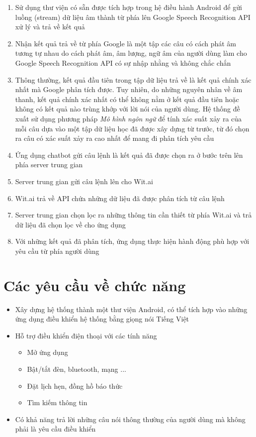 \documentclass[12pt]{report}
\begin{document}
\begin{enumerate}
	\item Sử dụng thư viện có sẵn được tích hợp trong hệ điều hành Android để gửi luồng (stream) dữ liệu âm thành từ phía lên Google Speech Recognition API xử lý và trả về kết quả
	\item Nhận kết quả trả về từ phía Google là một tập các câu có cách phát âm tương tự nhau do cách phát âm, âm lượng, ngữ âm của người dùng làm cho Google Speech Recognition API có sự nhập nhằng và không chắc chắn
	\item Thông thường, kết quả đầu tiên trong tập dữ liệu trả về là kết quả chính xác nhất mà Google phân tích được. Tuy nhiên, do những nguyên nhân về âm thanh, kết quả chính xác nhất có thể không nằm ở kết quả đầu tiên hoặc không có kết quả nào trùng khớp với lời nói của người dùng. Hệ thống đề xuất sử dụng phương pháp \textit{Mô hình ngôn ngữ} để tính xác suất xảy ra của mỗi câu dựa vào một tập dữ liệu học đã được xây dựng từ trước, từ đó chọn ra câu có xác suất xảy ra cao nhất để mang đi phân tích yêu cầu
	\item Ứng dụng chatbot gửi câu lệnh là kết quả đã được chọn ra ở bước trên lên phía server trung gian
	\item Server trung gian gửi câu lệnh lên cho Wit.ai
	\item Wit.ai trả về API chứa những dữ liệu đã được phân tích từ câu lệnh
	\item Server trung gian chọn lọc ra những thông tin cần thiết từ phía Wit.ai và trả dữ liệu đã chọn lọc về cho ứng dụng
	\item Với những kết quả đã phân tích, ứng dụng thực hiện hành động phù hợp với yêu cầu từ phía người dùng
\end{enumerate}

\section{Các yêu cầu về chức năng}
\begin{itemize}
	\item Xây dựng hệ thống thành một thư viện Android, có thể tích hợp vào những ứng dụng điều khiển hệ thống bằng giọng nói Tiếng Việt
	\item Hỗ trợ điều khiển điện thoại với các tính năng
	\begin{itemize}
		\item Mở ứng dụng
		\item Bật/tắt đèn, bluetooth, mạng ...
		\item Đặt lịch hẹn, đồng hồ báo thức
		\item Tìm kiếm thông tin
	\end{itemize}
	\item Có khả năng trả lời những câu nói thông thường của người dùng mà không phải là yêu cầu điều khiển
\end{itemize}
\end{document}
